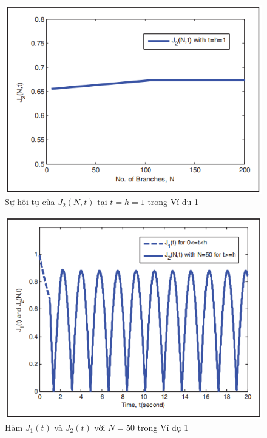 \begin{vd}
\begin{figure}[h!]
	\centering
	\includegraphics[scale= 0.7]{"./Hinh/Hinh12"}
	\caption[Sự hội tụ của $J_2(N,t)$ tại $t = h = 1$ trong Ví dụ 1]{Sự hội tụ của $J_2(N,t)$ tại $t = h = 1$ trong Ví dụ 1}
	\label{fig:hinh-12}
\end{figure}
\begin{figure}[h!]
	\centering
	\includegraphics[scale= 0.7]{"./Hinh/Hinh13"}
	\caption[Hàm $J_1(t)$ và $J_2(t)$ với $N = 50$ trong Ví dụ 1 ]{Hàm $J_1(t)$ và $J_2(t)$ với $N = 50$ trong Ví dụ 1}
	\label{fig:hinh-13}
\end{figure}
\begin{figure}[h!]
	\centering

\end{figure}
\end{vd}
